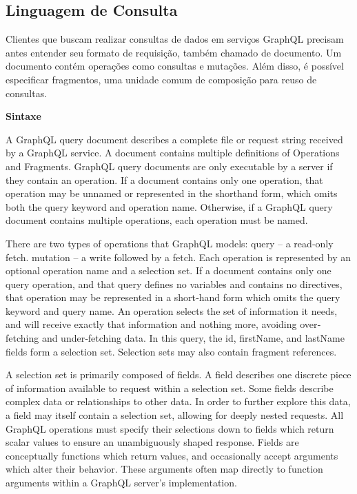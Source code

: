 \subsection[Linguagem de Consulta]{Linguagem de Consulta}

Clientes que buscam realizar consultas de dados em serviços GraphQL precisam antes entender seu formato de requisição, também chamado de documento. Um documento contém operações como consultas e mutações. Além disso, é possível especificar fragmentos, uma unidade comum de composição para reuso de consultas. \cite{GraphQL2016}

\textbf{Sintaxe}

A GraphQL query document describes a complete file or request string received by a GraphQL service. A document contains multiple definitions of Operations and Fragments. GraphQL query documents are only executable by a server if they contain an operation. If a document contains only one operation, that operation may be unnamed or represented in the shorthand form, which omits both the query keyword and operation name. Otherwise, if a GraphQL query document contains multiple operations, each operation must be named.

There are two types of operations that GraphQL models: query – a read‐only fetch. mutation – a write followed by a fetch. Each operation is represented by an optional operation name and a selection set. If a document contains only one query operation, and that query defines no variables and contains no directives, that operation may be represented in a short‐hand form which omits the query keyword and query name. An operation selects the set of information it needs, and will receive exactly that information and nothing more, avoiding over‐fetching and under‐fetching data. In this query, the id, firstName, and lastName fields form a selection set. Selection sets may also contain fragment references.

A selection set is primarily composed of fields. A field describes one discrete piece of information available to request within a selection set. Some fields describe complex data or relationships to other data. In order to further explore this data, a field may itself contain a selection set, allowing for deeply nested requests. All GraphQL operations must specify their selections down to fields which return scalar values to ensure an unambiguously shaped response. Fields are conceptually functions which return values, and occasionally accept arguments which alter their behavior. These arguments often map directly to function arguments within a GraphQL server’s implementation.

